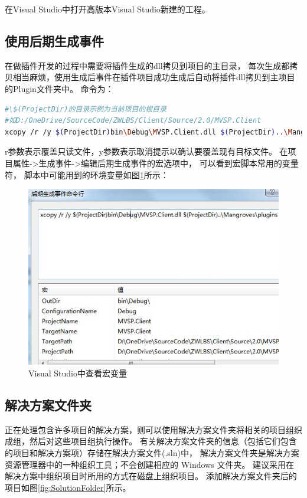 \documentclass{book}
\begin{document}
在Visual Studio中打开高版本Visual Studio新建的工程。

\subsection{使用后期生成事件}

在做插件开发的过程中需要将插件生成的dll拷贝到项目的主目录，
每次生成都拷贝相当麻烦，使用生成后事件在插件项目成功生成后自动将插件dll拷贝到主项目的Plugin文件夹中。
命令为：

\begin{lstlisting}[language=Bash]
#\$(ProjectDir)的目录示例为当前项目的根目录
#如D:/OneDrive/SourceCode/ZWLBS/Client/Source/2.0/MVSP.Client
xcopy /r /y $(ProjectDir)bin\Debug\MVSP.Client.dll $(ProjectDir)..\Mangroves\plugins
\end{lstlisting}

r参数表示覆盖只读文件，y参数表示取消提示以确认要覆盖现有目标文件。
在项目属性->生成事件->编辑后期生成事件的宏选项中，
可以看到宏脚本常用的变量符，
脚本中可能用到的环境变量如图\ref{fig:VisulStudioMicroVariable}所示：

\begin{figure}[htbp]
	\centering
	\includegraphics[scale=0.6]{VisulStudioMicroVariable.jpg}
	\caption{Visual Studio中查看宏变量}
	\label{fig:VisulStudioMicroVariable}
\end{figure}

\subsection{解决方案文件夹}

正在处理包含许多项目的解决方案，则可以使用解决方案文件夹将相关的项目组织成组，然后对这些项目组执行操作。
有关解决方案文件夹的信息（包括它们包含的项目和解决方案项）存储在解决方案文件(.sln)中，
解决方案文件夹是解决方案资源管理器中的一种组织工具；不会创建相应的 Windows 文件夹。
建议采用在解决方案中组织项目时所用的方式在磁盘上组织项目。
添加解决方案文件夹后的项目如图\ref{fig:SolutionFolder}所示。
\end{document}
